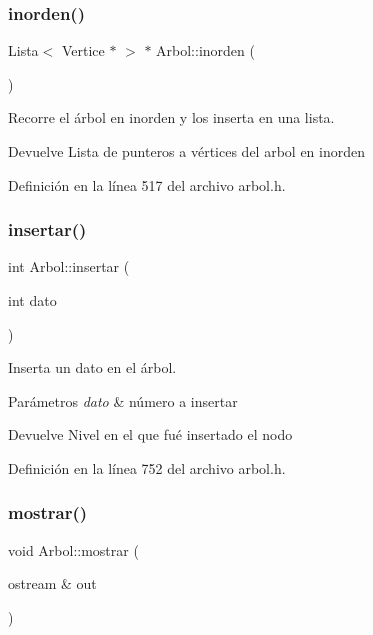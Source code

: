\subsubsection{\texorpdfstring{inorden()}{inorden()}}
{\footnotesize\ttfamily Lista$<$ Vertice $\ast$ $>$ $\ast$ Arbol\+::inorden (\begin{DoxyParamCaption}{ }\end{DoxyParamCaption})}



Recorre el árbol en inorden y los inserta en una lista. 

\begin{DoxyReturn}{Devuelve}
Lista de punteros a vértices del arbol en inorden 
\end{DoxyReturn}


Definición en la línea 517 del archivo arbol.\+h.

\mbox{\label{classArbol_af332559b5f9d894ecc6a707bb1550ae2}} 
\subsubsection{\texorpdfstring{insertar()}{insertar()}}
{\footnotesize\ttfamily int Arbol\+::insertar (\begin{DoxyParamCaption}\item[{int}]{dato }\end{DoxyParamCaption})}



Inserta un dato en el árbol. 


\begin{DoxyParams}{Parámetros}
{\em dato} & número a insertar \\
\hline
\end{DoxyParams}
\begin{DoxyReturn}{Devuelve}
Nivel en el que fué insertado el nodo 
\end{DoxyReturn}


Definición en la línea 752 del archivo arbol.\+h.

\mbox{\label{classArbol_a61749974f55056420f4e5a76eb664809}} 
\subsubsection{\texorpdfstring{mostrar()}{mostrar()}}
{\footnotesize\ttfamily void Arbol\+::mostrar (\begin{DoxyParamCaption}\item[{ostream \&}]{out }\end{DoxyParamCaption})}



